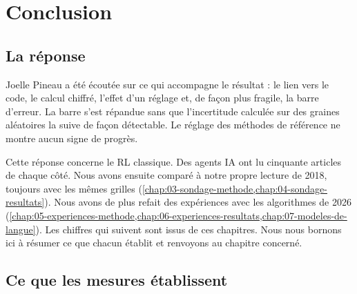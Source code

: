 \chapter{Conclusion}
\label{chap:11-conclusion}

\section{La réponse}
\label{sec:reponse}

\begin{keybox}
Joelle Pineau a été écoutée sur ce qui accompagne le résultat : le lien vers le code, le calcul
chiffré, l'effet d'un réglage et, de façon plus fragile, la barre d'erreur. La barre s'est répandue sans que l'incertitude
calculée sur des graines aléatoires la suive de façon détectable. Le réglage des méthodes de
référence ne montre aucun signe de progrès.
\end{keybox}

Cette réponse concerne le RL classique. Des agents IA ont lu cinquante articles de chaque côté.
Nous avons ensuite comparé à notre propre lecture de 2018, toujours avec les mêmes grilles
(\cref{chap:03-sondage-methode,chap:04-sondage-resultats}). Nous avons de plus refait des
expériences avec les algorithmes de 2026
(\cref{chap:05-experiences-methode,chap:06-experiences-resultats,chap:07-modeles-de-langue}). Les
chiffres qui suivent sont issus de ces chapitres. Nous nous bornons ici à résumer ce que chacun
établit et renvoyons au chapitre concerné.

\section{Ce que les mesures établissent}
\label{sec:nombres}

